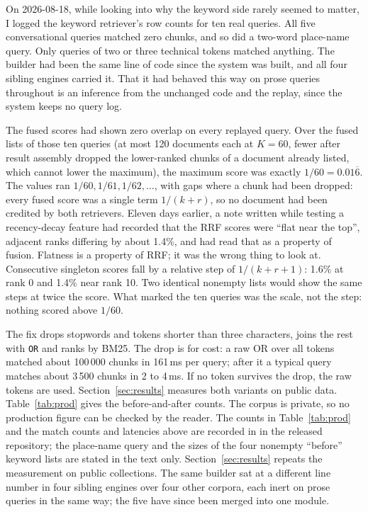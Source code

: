 \documentclass[11pt]{article}
\begin{document}
On 2026-08-18, while looking into why the keyword side rarely seemed to matter, I logged the keyword retriever's row counts for ten real queries. All five conversational queries matched zero chunks, and so did a two-word place-name query. Only queries of two or three technical tokens matched anything. The builder had been the same line of code since the system was built, and all four sibling engines carried it. That it had behaved this way on prose queries throughout is an inference from the unchanged code and the replay, since the system keeps no query log.

The fused scores had shown zero overlap on every replayed query. Over the fused lists of those ten queries (at most 120 documents each at $K = 60$, fewer after result assembly dropped the lower-ranked chunks of a document already listed, which cannot lower the maximum), the maximum score was exactly $1/60 = 0.01\overline{6}$. The values ran $1/60, 1/61, 1/62, \ldots$, with gaps where a chunk had been dropped: every fused score was a single term $1/(k+r)$, so no document had been credited by both retrievers. Eleven days earlier, a note written while testing a recency-decay feature had recorded that the RRF scores were ``flat near the top'', adjacent ranks differing by about 1.4\%, and had read that as a property of fusion. Flatness is a property of RRF; it was the wrong thing to look at. Consecutive singleton scores fall by a relative step of $1/(k+r+1)$: 1.6\% at rank 0 and 1.4\% near rank 10. Two identical nonempty lists would show the same steps at twice the score. What marked the ten queries was the scale, not the step: nothing scored above $1/60$.

The fix drops stopwords and tokens shorter than three characters, joins the rest with \verb|OR| and ranks by BM25. The drop is for cost: a raw OR over all tokens matched about 100\,000 chunks in 161\,ms per query; after it a typical query matches about 3\,500 chunks in 2 to 4\,ms. If no token survives the drop, the raw tokens are used. Section~\ref{sec:results} measures both variants on public data. Table~\ref{tab:prod} gives the before-and-after counts. The corpus is private, so no production figure can be checked by the reader. The counts in Table~\ref{tab:prod} and the match counts and latencies above are recorded in  in the released repository; the place-name query and the sizes of the four nonempty ``before'' keyword lists are stated in the text only. Section~\ref{sec:results} repeats the measurement on public collections. The same builder sat at a different line number in four sibling engines over four other corpora, each inert on prose queries in the same way; the five have since been merged into one module.
\end{document}
